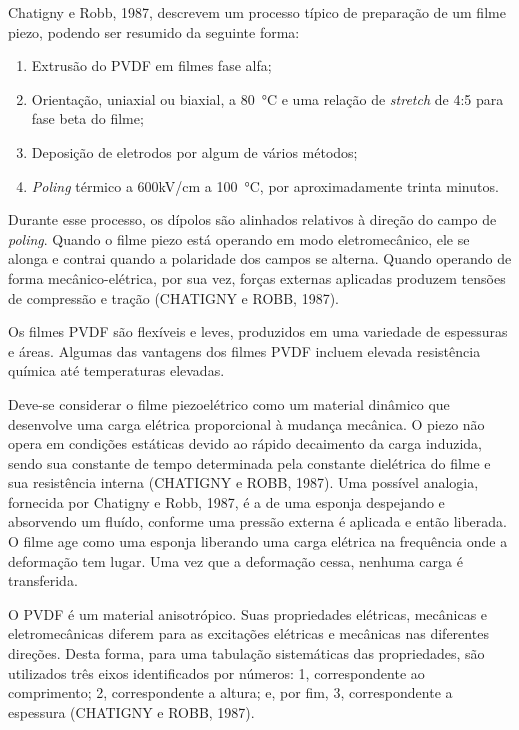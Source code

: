 \documentclass[
	12pt,				
	oneside,			
	a4paper,			
	english,			
	brazil,	
	sumario=abnt-6027-2012		
	]{abntex2ppgsi}
\begin{document}
Chatigny e Robb, 1987, descrevem um processo típico de preparação de um filme piezo, podendo ser resumido da seguinte forma:

\begin{enumerate}
	\item Extrusão do PVDF em filmes fase alfa; 
	\item Orientação, uniaxial ou biaxial, a \SI{80}{\celsius} e uma relação de \textit{stretch} de 4:5 para fase beta do filme;
	\item Deposição de eletrodos por algum de vários métodos;
	\item \textit{Poling} térmico a 600kV/cm a \SI{100}{\celsius}, por aproximadamente trinta minutos.
\end{enumerate}

Durante esse processo, os dípolos são alinhados relativos à direção do campo de \textit{poling}. Quando o filme piezo está operando em modo eletromecânico, ele se alonga e contrai quando a polaridade dos campos se alterna. Quando operando de forma mecânico-elétrica, por sua vez, forças externas aplicadas produzem tensões de compressão e tração (CHATIGNY e ROBB, 1987). 

Os filmes PVDF são flexíveis e leves, produzidos em uma variedade de espessuras e áreas. Algumas das vantagens dos filmes PVDF incluem elevada resistência química até temperaturas elevadas. 

Deve-se considerar o filme piezoelétrico como um material dinâmico que desenvolve uma carga elétrica proporcional à mudança mecânica. O piezo não opera em condições estáticas devido ao rápido decaimento da carga induzida, sendo sua constante de tempo determinada pela constante dielétrica do filme e sua resistência interna (CHATIGNY e ROBB, 1987). Uma possível analogia, fornecida por Chatigny e Robb, 1987, é a de uma esponja despejando e absorvendo um fluído, conforme uma pressão externa é aplicada e então liberada. O filme age como uma esponja liberando uma carga elétrica na frequência onde a deformação tem lugar. Uma vez que a deformação cessa, nenhuma carga é transferida. 

O PVDF é um material anisotrópico.  Suas propriedades elétricas, mecânicas e eletromecânicas diferem para as excitações elétricas e mecânicas nas diferentes direções. Desta forma, para uma tabulação sistemáticas das propriedades, são utilizados três eixos identificados por números: 1, correspondente ao comprimento; 2, correspondente a altura; e, por fim, 3, correspondente a espessura (CHATIGNY e ROBB, 1987). 
\end{document}
